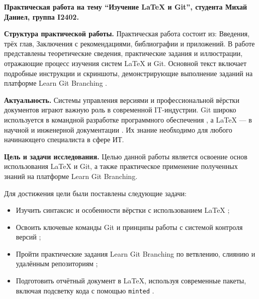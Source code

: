 \documentclass[a4paper,12pt]{report}
\newcommand{\uniGroupName}{I2402}
\newcommand{\authorNameRu}{Михай Даниел}
\newcommand{\thesisTitleRu}{Изучение \LaTeX{} и Git}
\begin{document}


\clearpage
\tableofcontents %


\clearpage
{}

\textbf{Практическая работа на тему ``\thesisTitleRu{}'', студента \authorNameRu{}, группа \uniGroupName{}.}

\textbf{Структура практической работы.}
Практическая работа состоит из: Введения, трёх глав, Заключения с рекомендациями, библиографии и приложений. В работе представлены теоретические сведения, практические задания и иллюстрации, отражающие процесс изучения систем \LaTeX{} и Git. Основной текст включает подробные инструкции и скриншоты, демонстрирующие выполнение заданий на платформе Learn Git Branching \cite{learngitbranching}.

\textbf{Актуальность.}
Системы управления версиями и профессиональной вёрстки документов играют важную роль в современной IT-индустрии. Git широко используется в командной разработке программного обеспечения \cite{git_official_doc, progit_book}, а \LaTeX{} — в научной и инженерной документации \cite{latex_official_doc, latex_project_site, overleaf_intro}. Их знание необходимо для любого начинающего специалиста в сфере ИТ.

\textbf{Цель и задачи исследования.}
Целью данной работы является освоение основ использования \LaTeX{} и Git, а также практическое применение полученных знаний на платформе Learn Git Branching.

Для достижения цели были поставлены следующие задачи:
\begin{itemize}
  \item Изучить синтаксис и особенности вёрстки с использованием \LaTeX{} \cite{latex_official_doc, latex_project_site};
  \item Освоить ключевые команды Git и принципы работы с системой контроля версий \cite{progit_book};
  \item Пройти практические задания Learn Git Branching по ветвлению, слиянию и удалённым репозиториям \cite{learngitbranching};
  \item Подготовить отчётный документ в \LaTeX{}, используя современные пакеты, включая подсветку кода с помощью \texttt{minted} \cite{latex_minted}.
\end{itemize}
\end{document}
